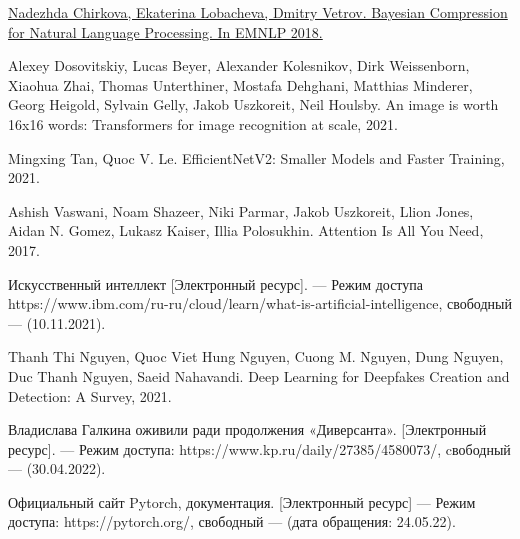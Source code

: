 \newpage 
\printbibliography[heading=bibintoc] 

\begin{thebibliography}{0}
	\hypertarget{chirkova18}{}
	\href{https://arxiv.org/abs/1810.10927}
	{Nadezhda Chirkova, Ekaterina Lobacheva, Dmitry Vetrov. Bayesian Compression for Natural Language Processing. In EMNLP 2018.}
	
	Alexey Dosovitskiy, Lucas Beyer, Alexander Kolesnikov, Dirk Weissenborn, Xiaohua Zhai, Thomas Unterthiner, Mostafa Dehghani, Matthias Minderer,
	Georg Heigold, Sylvain Gelly, Jakob Uszkoreit, Neil Houlsby. An image is worth 16x16 words: Transformers for image recognition at scale, 2021.
	
	Mingxing Tan, Quoc V. Le. EfficientNetV2: Smaller Models and Faster Training, 2021.
	
	Ashish Vaswani, Noam Shazeer, Niki Parmar, Jakob Uszkoreit, Llion Jones, Aidan N. Gomez, Lukasz Kaiser, Illia Polosukhin. Attention Is All You Need, 2017.
	
	Искусственный интеллект [Электронный ресурс]. — Режим доступа https://www.ibm.com/ru-ru/cloud/learn/what-is-artificial-intelligence, свободный — (10.11.2021).
	
	Thanh Thi Nguyen, Quoc Viet Hung Nguyen, Cuong M. Nguyen, Dung Nguyen, Duc Thanh Nguyen, Saeid Nahavandi. Deep Learning for Deepfakes Creation and
	Detection: A Survey, 2021.
	
	 Владислава Галкина оживили ради продолжения «Диверсанта». [Электронный ресурс]. — Режим доступа: https://www.kp.ru/daily/27385/4580073/, cвободный — (30.04.2022).
	
	 Официальный сайт Pytorch, документация. [Электронный ресурс] — Режим доступа: https://pytorch.org/, свободный — (дата обращения: 24.05.22).
	
\end{thebibliography}
